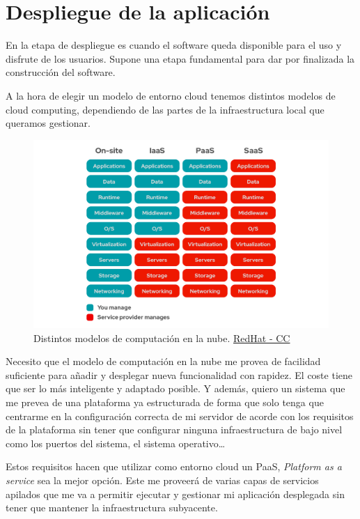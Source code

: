 \chapter{Despliegue de la aplicación}
En la etapa de despliegue es cuando el software queda disponible para el uso y disfrute de
los usuarios. Supone una etapa fundamental para dar por finalizada la construcción del
software. 

A la hora de elegir un modelo de entorno cloud tenemos distintos modelos de cloud
computing, dependiendo de las partes de la infraestructura local que queramos gestionar.

\FloatBarrier
\begin{figure}[h]
	\centering	
	\includegraphics[width=\textwidth]{doc/logos/imgs/iaas-paas.png}
    \caption{ Distintos modelos de computación en la nube.
	\href{https://www.redhat.com/es/topics/cloud-computing/iaas-vs-paas-vs-saas}{RedHat -
	CC}}
    \label{fig:tipos-de-cc}
\end{figure}
\FloatBarrier


Necesito que el modelo de computación en la nube me provea de facilidad suficiente para
añadir y desplegar nueva funcionalidad con rapidez. El coste tiene que ser lo más
inteligente y adaptado posible. Y además, quiero un sistema que me prevea de una
plataforma ya estructurada de forma que solo tenga que centrarme en la configuración
correcta de mi servidor de acorde con los requisitos de la plataforma sin tener que
configurar ninguna infraestructura de bajo nivel como los puertos del sistema, el sistema
operativo\ldots


Estos requisitos hacen que utilizar como entorno cloud un PaaS, \textit{Platform as a
service} sea la mejor opción. Este me proveerá de varias capas de servicios apilados que me va a permitir ejecutar y
gestionar mi aplicación desplegada sin tener que mantener la infraestructura subyacente.


